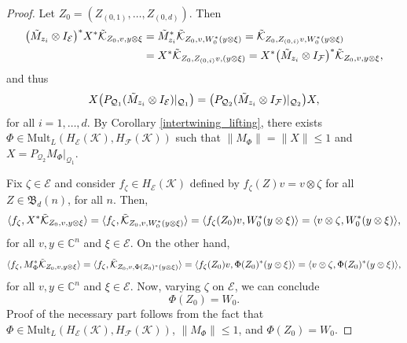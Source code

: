 \documentclass[12pt]{amsart}%
\numberwithin{equation}{section}
\newcommand{\fB}{{\mathfrak{B}}}
\newcommand{\cle}{\mathcal{E}}
\newcommand{\clf}{\mathcal{F}}
\newcommand{\clk}{\mathcal{K}}
\newcommand{\clq}{\mathcal{Q}}
\newcommand{\C}{\mathbb{C}}
\newcommand\la{{\langle }}
\newcommand\ra{{\rangle}}
\begin{document}
\begin{proof}
Let $Z_0=(Z_{(0,1)} ,\ldots,Z_{(0,d)})$. Then
\begin{align*}
\big(\Tilde{M}_{z_i}\otimes I_{\cle}\big)^*  X^*\Tilde{\clk}_{Z_0, v, y\otimes\xi}&=\Tilde{M}^*_{z_i} \Tilde{\clk}_{Z_0, v, W^*_0 (y\otimes\xi)}= \Tilde{\clk}_{Z_0, Z_{(0,i)} v, W^*_0 (y\otimes\xi)}\\&=X^*\Tilde{\clk}_{Z_0, Z_{(0,i)} v, (y\otimes\xi)}=X^* \big(\Tilde{M}_{z_i}\otimes I_{\clf}\big)^* \Tilde{\clk}_{Z_0, v, y\otimes\xi},
\end{align*}
and thus
\[X \big(P_{\clq_1}(\Tilde{M}_{z_i}\otimes I_\cle)|_{\clq_1}\big)=\big(P_{\clq_2}(\Tilde{M}_{z_i}\otimes I_\clf)|_{\clq_2}\big) X, \]
for all $i=1,\ldots, d$. By Corollary \ref{intertwining_lifting}, there exists $\Phi\in \text{Mult}_L(H_\cle(\clk), H_\clf(\clk))$ such that $\|M_\Phi\|=\|X\|\leq 1$ and $X=P_{\clq_2} M_\Phi|_{\clq_1}$. 

Fix $\zeta\in\cle$ and consider $f_{\zeta}\in H_\cle(\clk)$ defined by $f_{\zeta}(Z)v=v\otimes\zeta$ for all $Z\in \fB_d(n)$, for all $n$. Then,
 \begin{align*}
 \la f_\zeta,X^*\Tilde{\clk}_{Z_0, v, y\otimes \xi} \ra=\la f_\zeta, \Tilde{\clk}_{Z_0, v, W^*_0 (y\otimes\xi)}  \ra=\la f_{\zeta}(Z_0) v, W^*_0 (y\otimes\xi)\ra=\la  v\otimes \zeta, W^*_0 (y\otimes\xi)\ra,
 \end{align*}
for all $v, y\in \C^n$ and $\xi\in\cle$. On the other hand,
 \begin{align*}
 \la f_\zeta,M_{\Phi}^*\Tilde{\clk}_{Z_0, v, y\otimes \xi} \ra=\la f_\zeta, \Tilde{\clk}_{Z_0, v, \Phi(Z_0)^* (y\otimes\xi)}  \ra=\la f_{\zeta}(Z_0) v, \Phi(Z_0)^* (y\otimes\xi)\ra=\la  v\otimes \zeta, \Phi(Z_0)^* (y\otimes\xi)\ra,
 \end{align*}
 for all $v, y\in \C^n$ and $\xi\in\cle$. Now, varying $\zeta$ on $\cle$, we can conclude
\[\Phi(Z_0)=W_0.\]
Proof of the necessary part follows from the fact that $\Phi\in \text{Mult}_L(H_\cle(\clk), H_\clf(\clk))$, $\|M_\Phi\|\leq 1$, and $\Phi(Z_0)=W_0$.
\end{proof}
\end{document}
